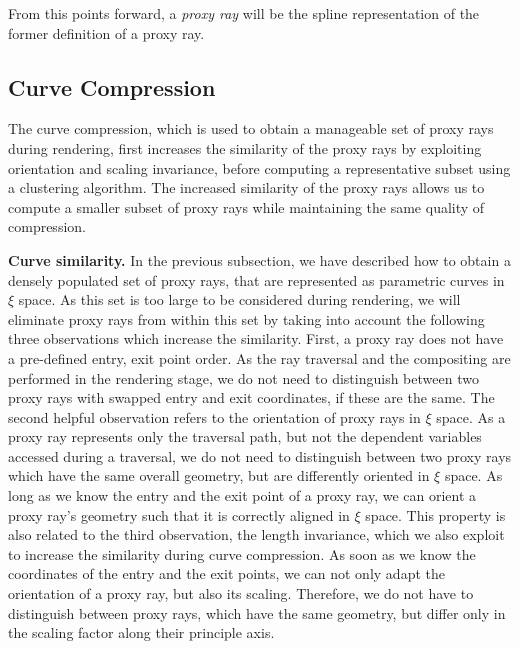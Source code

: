 \documentclass[journal]{vgtc}                %
\begin{document}
From this points forward, a \emph{proxy ray} will be the spline representation of the former definition of a proxy ray.
%
%
%
\subsection{Curve Compression}\label{subsec:curvecompression}
The curve compression, which is used to obtain a manageable set of proxy rays during rendering, first increases the similarity of the proxy rays by exploiting orientation and scaling invariance, before computing a representative subset using a clustering algorithm. The increased similarity of the proxy rays allows us to compute a smaller subset of proxy rays while maintaining the same quality of compression.

\noindent \textbf{Curve similarity.} In the previous subsection, we have described how to obtain a densely populated set of proxy rays, that are represented as parametric curves in $\xi$ space. As this set is too large to be considered during rendering, we will eliminate proxy rays from within this set by taking into account the following three observations which increase the similarity. First, a proxy ray does not have a pre-defined entry, exit point order. As the ray traversal and the compositing are performed in the rendering stage, we do not need to distinguish between two proxy rays with swapped entry and exit coordinates, if these are the same. The second helpful observation refers to the orientation of proxy rays in $\xi$ space. As a proxy ray represents only the traversal path, but not the dependent variables accessed during a traversal, we do not need to distinguish between two proxy rays which have the same overall geometry, but are differently oriented in $\xi$ space. As long as we know the entry and the exit point of a proxy ray, we can orient a proxy ray's geometry such that it is correctly aligned in $\xi$ space. This property is also related to the third observation, the length invariance, which we also exploit to increase the similarity during curve compression. As soon as we know the coordinates of the entry and the exit points, we can not only adapt the orientation of a proxy ray, but also its scaling. Therefore, we do not have to distinguish between proxy rays, which have the same geometry, but differ only in the scaling factor along their principle axis.
\end{document}
